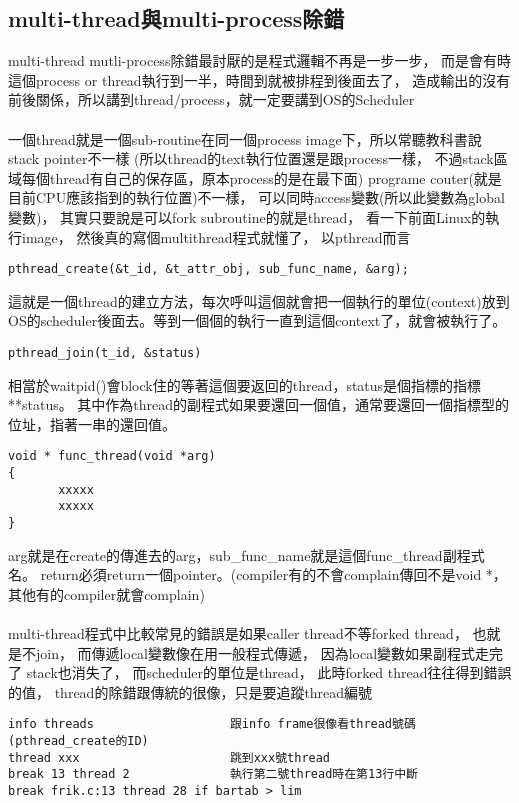   \subsection{multi-thread與multi-process除錯}
  multi-thread mutli-process除錯最討厭的是程式邏輯不再是一步一步，
  而是會有時這個process or thread執行到一半，時間到就被排程到後面去了，
  造成輸出的沒有前後關係，所以講到thread/process，就一定要講到OS的Scheduler
  \\\\    
  一個thread就是一個sub-routine在同一個process image下，所以常聽教科書說 stack 
  pointer不一樣 (所以thread的text執行位置還是跟process一樣，
  不過stack區域每個thread有自己的保存區，原本process的是在最下面)
  programe couter(就是目前CPU應該指到的執行位置)不一樣，
  可以同時access變數(所以此變數為global變數)，
  其實只要說是可以fork subroutine的就是thread，
  看一下前面Linux的執行image， 然後真的寫個multithread程式就懂了，
  以pthread而言
  \begin{verbatim}
pthread_create(&t_id, &t_attr_obj, sub_func_name, &arg);
  \end{verbatim}
  這就是一個thread的建立方法，每次呼叫這個就會把一個執行的單位(context)放到
  OS的scheduler後面去。等到一個個的執行一直到這個context了，就會被執行了。
  \begin{verbatim}
pthread_join(t_id, &status)
  \end{verbatim}
  相當於waitpid()會block住的等著這個要返回的thread，status是個指標的指標**status。
  其中作為thread的副程式如果要還回一個值，通常要還回一個指標型的位址，指著一串的還回值。
\begin{verbatim}
void * func_thread(void *arg)
{
       xxxxx
       xxxxx
}
\end{verbatim}
 arg就是在create的傳進去的arg，sub\_func\_name就是這個func\_thread副程式名。
 return必須return一個pointer。(compiler有的不會complain傳回不是void *，
 其他有的compiler就會complain)
 \\\\
  multi-thread程式中比較常見的錯誤是如果caller thread不等forked thread，
  也就是不join， 而傳遞local變數像在用一般程式傳遞， 因為local變數如果副程式走完了
  stack也消失了， 而scheduler的單位是thread， 此時forked thread往往得到錯誤的值，
  thread的除錯跟傳統的很像，只是要追蹤thread編號
  \begin{verbatim}
info threads                   跟info frame很像看thread號碼(pthread_create的ID)
thread xxx                     跳到xxx號thread
break 13 thread 2              執行第二號thread時在第13行中斷
break frik.c:13 thread 28 if bartab > lim
  \end{verbatim}
